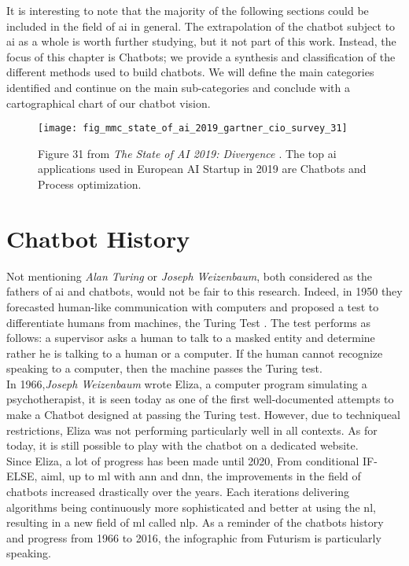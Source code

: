 It is interesting to note that the majority of the following sections could be included in the field of \gls{ai} in general. The extrapolation of the chatbot subject to \gls{ai} as a whole is worth further studying, but it not part of this work. Instead, the focus of this chapter is Chatbots; we provide a synthesis and classification of the different methods used to build chatbots. We will define the main categories identified and continue on the main sub-categories and conclude with a cartographical chart of our chatbot vision.



\begin{figure}[H]
    \centering
    \texttt{[image: fig\_mmc\_state\_of\_ai\_2019\_gartner\_cio\_survey\_31]}
    \caption{Figure 31 from \textit{The State of AI 2019: Divergence \autocite{report:Kelnar2019}}. The top \gls{ai} applications used in European AI Startup in 2019 are Chatbots and Process optimization.}
    \label{fig:fig_mmc_state_of_ai_2019_gartner_cio_survey_31}
\end{figure}



\section{Chatbot History}
\label{chatbot:history}
Not mentioning \textit{Alan Turing} or \textit{Joseph Weizenbaum}, both considered as the fathers of \gls{ai} and chatbots, would not be fair to this research. Indeed, in 1950 they forecasted human-like communication with computers and proposed a test to differentiate humans from machines, the Turing Test \autocite{paper:turing}. The test performs as follows: a supervisor asks a human to talk to a masked entity and determine rather he is talking to a human or a computer. If the human cannot recognize speaking to a computer, then the machine passes the Turing test.\\

In 1966,\textit{Joseph Weizenbaum} wrote Eliza\autocite{website:eliza}, a computer program simulating a psychotherapist, it is seen today as one of the first well-documented attempts to make a Chatbot designed at passing the Turing test. However, due to techniqueal restrictions, Eliza was not performing particularly well in all contexts. As for today, it is still possible to play with the chatbot on a dedicated website.\\

Since Eliza, a lot of progress has been made until 2020, From conditional IF-ELSE, \gls{aiml}, up to \gls{ml} with \gls{ann} and \gls{dnn}, the improvements in the field of chatbots increased drastically over the years. Each iterations delivering algorithms being continuously more sophisticated and better at using the \gls{nl}, resulting in a new field of \gls{ml} called \gls{nlp}. As a reminder of the chatbots history and progress from 1966 to 2016, the  infographic\autocite{online:futurism_history_infography} from Futurism is particularly speaking. 


